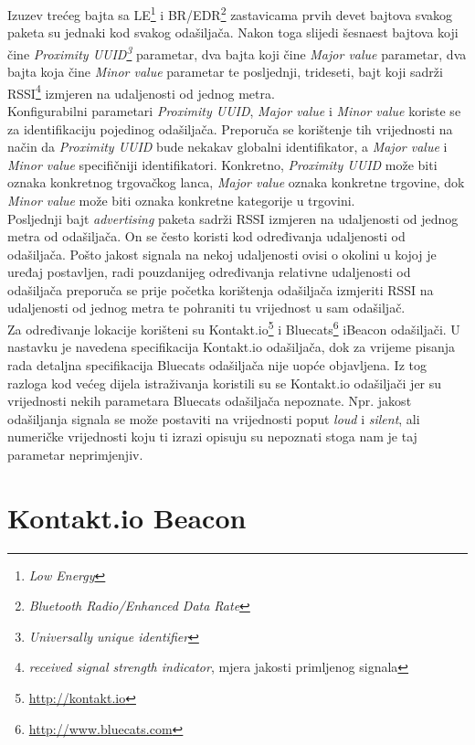 Izuzev trećeg bajta sa LE\footnote{\textit{Low Energy}} i BR/EDR\footnote{\textit{Bluetooth Radio/Enhanced Data Rate}} zastavicama prvih devet bajtova svakog paketa su jednaki kod svakog odašiljača. 
Nakon toga slijedi šesnaest bajtova koji čine \textit{Proximity UUID\footnote{\textit{Universally unique identifier}}} parametar, dva bajta koji čine \textit{Major value} parametar, dva bajta koja čine \textit{Minor value} parametar te posljednji, trideseti, bajt koji sadrži RSSI\footnote{\textit{received signal strength indicator}, mjera jakosti primljenog signala} izmjeren na udaljenosti od jednog metra.
\\
Konfigurabilni parametari \textit{Proximity UUID}, \textit{Major value} i \textit{Minor value} koriste se za identifikaciju pojedinog odašiljača. 
Preporuča se korištenje tih vrijednosti na način da \textit{Proximity UUID} bude nekakav globalni identifikator, a \textit{Major value} i \textit{Minor value} specifičniji identifikatori. 
Konkretno, \textit{Proximity UUID} može biti oznaka konkretnog trgovačkog lanca, \textit{Major value} oznaka konkretne trgovine, dok \textit{Minor value} može biti oznaka konkretne kategorije u trgovini.
\\
Posljednji bajt \textit{advertising} paketa sadrži RSSI izmjeren na udaljenosti od jednog metra od odašiljača. 
On se često koristi kod određivanja udaljenosti od odašiljača. 
Pošto jakost signala na nekoj udaljenosti ovisi o okolini u kojoj je uređaj postavljen, radi pouzdanijeg određivanja relativne udaljenosti od odašiljača preporuča se prije početka korištenja odašiljača izmjeriti RSSI na udaljenosti od jednog metra te pohraniti tu vrijednost u sam odašiljač.
\\

Za određivanje lokacije korišteni su Kontakt.io\footnote{\url{http://kontakt.io}} i Bluecats\footnote{\url{http://www.bluecats.com}} iBeacon odašiljači. 
U nastavku je navedena specifikacija Kontakt.io odašiljača, dok za vrijeme pisanja rada detaljna specifikacija Bluecats odašiljača nije uopće objavljena. 
Iz tog razloga kod većeg dijela istraživanja koristili su se Kontakt.io odašiljači jer su vrijednosti nekih parametara Bluecats odašiljača nepoznate. 
Npr. jakost odašiljanja signala  se može postaviti na vrijednosti poput \textit{loud} i \textit{silent}, ali numeričke vrijednosti koju ti izrazi opisuju su nepoznati stoga nam je taj parametar neprimjenjiv.

\section{Kontakt.io Beacon}

